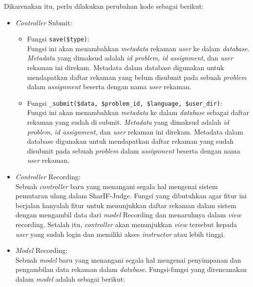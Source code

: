 Dikarenakan itu, perlu dilakukan perubahan kode sebagai berikut:

\begin{itemize}
    \item \textit{Controller} Submit:
    \begin{itemize}
        \item Fungsi \verb|save($type)|: \\
        Fungsi ini akan menambahkan \textit{metadata} rekaman \textit{user} ke dalam \textit{database}. \textit{Metadata} yang dimaksud adalah \textit{id problem}, \textit{id assignment}, dan \textit{user} rekaman ini direkam. Metadata dalam database digunakan untuk mendapatkan daftar rekaman yang belum disubmit pada sebuah \textit{problem} dalam \textit{assignment} beserta dengan nama \textit{user} rekaman.
        \item Fungsi \verb|_submit($data, $problem_id, $language, $user_dir)|: \\
        Fungsi ini akan menambahkan \textit{metadata} ke dalam \textit{database} sebagai daftar rekaman yang sudah di submit. \textit{Metadata} yang dimaksud adalah \textit{id problem}, \textit{id assignment}, dan \textit{user} rekaman ini direkam. Metadata dalam database digunakan untuk mendapatkan daftar rekaman yang sudah disubmit pada sebuah \textit{problem} dalam \textit{assignment} beserta dengan nama \textit{user} rekaman.
    \end{itemize}
    \item \textit{Controller} Recording: \\
    Sebuah \textit{controller} baru yang menangani segala hal mengenai sistem pemutaran ulang dalam SharIF-Judge. Fungsi yang dibutuhkan agar fitur ini berjalan hanyalah fitur untuk menunjukkan daftar rekaman dalam sistem dengan mengambil data dari \textit{model} Recording dan menaruhnya dalam \textit{view} recording. Setalah itu, \textit{controller} akan menunjukkan \textit{view} tersebut kepada \textit{user} yang sudah login dan memiliki akses \textit{instructor} atau lebih tinggi.
    \item \textit{Model} Recording: \\
    Sebuah \textit{model} baru yang menangani segala hal mengenai penyimpanan dan pengambilan data rekaman dalam \textit{database}. Fungsi-fungsi yang direncanakan dalam \textit{model} adalah sebagai berikut:
    \begin{itemize}

\end{itemize}
\end{itemize}
